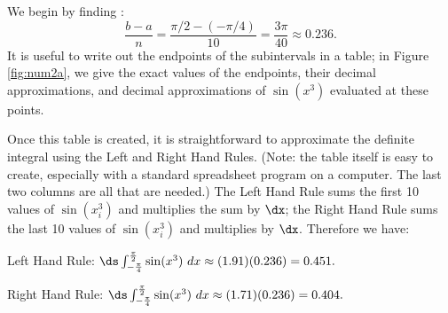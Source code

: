 {We begin by finding \dx:
$$\frac{b-a}{n} = \frac{\pi/2 - (-\pi/4)}{10} = \frac{3\pi}{40}\approx 0.236.$$
It is useful to write out the endpoints of the subintervals in a table; in Figure \ref{fig:num2a}, we give the exact values of the endpoints, their decimal approximations, and decimal approximations of $\sin(x^3)$ evaluated at these points. 

Once this table is created, it is straightforward to approximate the definite integral using the Left and Right Hand Rules. (Note: the table itself is easy to create, especially with a standard spreadsheet program on a computer. The last two columns are all that are needed.) The Left Hand Rule sums the first 10 values of $\sin(x_i^3)$ and multiplies the sum by $\dx$; the Right Hand Rule sums the last 10 values of $\sin(x_i^3)$ and multiplies by $\dx$. Therefore we have:

Left Hand Rule: $\ds \int_{-\frac{\pi}4}^{\frac{\pi}2}\sin(x^3)\ dx \approx (1.91)(0.236) = 0.451.$

Right Hand Rule: $\ds \int_{-\frac{\pi}4}^{\frac{\pi}2}\sin(x^3)\ dx \approx (1.71)(0.236) = 0.404.$

}
